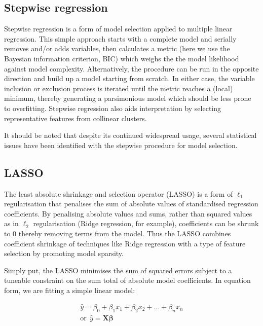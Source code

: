 \documentclass[a4paper,11pt,oneside]{book}
\begin{document}
\subsection{Stepwise regression}\label{meth:stepregress}

Stepwise regression is a form of model selection applied to multiple linear regression. This simple approach starts with a complete model and serially removes and/or adds variables, then calculates a metric (here we use the Bayesian information criterion, BIC) which weighs the the model likelihood against model complexity. Alternatively, the procedure can be run in the opposite direction and build up a model starting from scratch. In either case, the variable inclusion or exclusion process is iterated until the metric reaches a (local) minimum, thereby generating a  parsimonious model which should be less prone to overfitting. Stepwise regression also aids interpretation by selecting representative features from collinear clusters.\cite{Mantel1970} 

It should be noted that despite its continued widespread usage, several statistical issues have been identified with the stepwise procedure for model selection.\cite{Hurvich1990, Whittingham2006}

\subsection{LASSO}\label{meth:lasso}

The least absolute shrinkage and selection operator (LASSO) is a form of $\ell_1$ regularisation that penalises the sum of absolute values of standardised regression coefficients. By penalising absolute values and sums, rather than squared values as in $\ell_2$ regularisation (Ridge regression, for example), coefficients can be shrunk to $0$ thereby removing terms from the model. Thus the LASSO combines coefficient shrinkage of techniques like Ridge regression with a type of feature selection by promoting model sparsity.\cite{Tibshirani1994, Hastie2001}

Simply put, the LASSO minimises the sum of squared errors subject to a tuneable constraint on the sum total of absolute model coefficients. In equation form, we are fitting a simple linear model:

\begin{equation}
\begin{aligned}
\hat{y} = \beta_0 + \beta_1 x_1 + \beta_2 x_2 + \ldots + \beta_n x_n\\
\mathrm{or}~~\hat{y} = \bm{X}\bm{\beta} %
\end{aligned}
\end{equation} \vspace{.2em}
\end{document}
